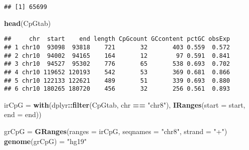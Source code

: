 \documentclass[]{article}
\newenvironment{Shaded}{\begin{snugshade}}{\end{snugshade}}
\newcommand{\KeywordTok}[1]{\textcolor[rgb]{0.13,0.29,0.53}{\textbf{#1}}}
\newcommand{\DataTypeTok}[1]{\textcolor[rgb]{0.13,0.29,0.53}{#1}}
\newcommand{\StringTok}[1]{\textcolor[rgb]{0.31,0.60,0.02}{#1}}
\newcommand{\OtherTok}[1]{\textcolor[rgb]{0.56,0.35,0.01}{#1}}
\newcommand{\OperatorTok}[1]{\textcolor[rgb]{0.81,0.36,0.00}{\textbf{#1}}}
\newcommand{\NormalTok}[1]{#1}
\begin{document}
\begin{Shaded}
\end{Shaded}

\begin{verbatim}
## [1] 65699
\end{verbatim}

\begin{Shaded}
\begin{Highlighting}[]
\KeywordTok{head}\NormalTok{(CpGtab)}
\end{Highlighting}
\end{Shaded}

\begin{verbatim}
##     chr  start    end length CpGcount GCcontent pctGC obsExp
## 1 chr10  93098  93818    721       32       403 0.559  0.572
## 2 chr10  94002  94165    164       12        97 0.591  0.841
## 3 chr10  94527  95302    776       65       538 0.693  0.702
## 4 chr10 119652 120193    542       53       369 0.681  0.866
## 5 chr10 122133 122621    489       51       339 0.693  0.880
## 6 chr10 180265 180720    456       32       256 0.561  0.893
\end{verbatim}

\begin{Shaded}
\begin{Highlighting}[]
\NormalTok{irCpG =}\StringTok{ }\KeywordTok{with}\NormalTok{(dplyr}\OperatorTok{::}\KeywordTok{filter}\NormalTok{(CpGtab, chr }\OperatorTok{==}\StringTok{ "chr8"}\NormalTok{),}
             \KeywordTok{IRanges}\NormalTok{(}\DataTypeTok{start =}\NormalTok{ start, }\DataTypeTok{end =}\NormalTok{ end))}
\end{Highlighting}
\end{Shaded}

\begin{Shaded}
\begin{Highlighting}[]
\NormalTok{grCpG =}\StringTok{ }\KeywordTok{GRanges}\NormalTok{(}\DataTypeTok{ranges =}\NormalTok{ irCpG, }\DataTypeTok{seqnames =} \StringTok{"chr8"}\NormalTok{, }\DataTypeTok{strand =} \StringTok{"+"}\NormalTok{)}
\KeywordTok{genome}\NormalTok{(grCpG) =}\StringTok{ "hg19"}
\end{Highlighting}
\end{Shaded}
\end{document}
